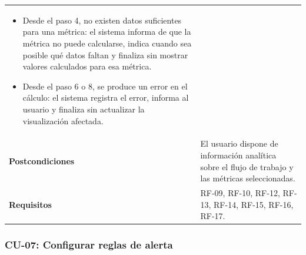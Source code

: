 {\begin{longtable}{p{3.2cm}p{10.2cm}}
\begin{minipage}[t]{10.2cm}
\begin{itemize}[noitemsep,leftmargin=*]
    \item Desde el paso 4, no existen datos suficientes para una métrica: el sistema informa de que la métrica no puede calcularse, indica cuando sea posible qué datos faltan y finaliza sin mostrar valores calculados para esa métrica.
    \item Desde el paso 6 o 8, se produce un error en el cálculo: el sistema registra el error, informa al usuario y finaliza sin actualizar la visualización afectada.
\end{itemize}\end{minipage} \\
\textbf{Postcondiciones} & El usuario dispone de información analítica sobre el flujo de trabajo y las métricas seleccionadas. \\
\textbf{Requisitos} & RF-09, RF-10, RF-12, RF-13, RF-14, RF-15, RF-16, RF-17. \\
\bottomrule
\end{longtable}
\vspace{0.45em}
}

\clearpage
\subsubsection{CU-07: Configurar reglas de alerta}

